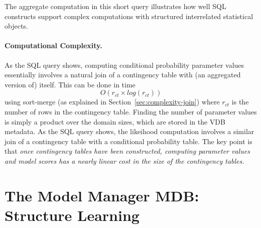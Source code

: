 The aggregate computation in this short query illustrates how well SQL constructs support complex computations with structured interrelated statistical objects. 

%

\paragraph{Computational Complexity.} As the SQL query shows, computing conditional probability parameter values essentially involves a natural join of a contingency table with (an aggregated version of) itself. This can be done in time $$O(r_{ct} \times log(r_{ct}))$$ using sort-merge (as explained in Section~\ref{sec:complexity-join}) where $r_{ct}$ is the number of rows in the contingency table. Finding the number of parameter values is simply a product over the domain sizes, which are stored in the VDB metadata. As the SQL query shows, the likeihood computation involves a similar join of a contingency table with a conditional probability table. The key point is that {\em once contingency tables have been constructed, computing parameter values and model scores has a nearly linear cost in the size of the contingency tables.} \label{sec:score-complexity}


\section{The Model Manager MDB: Structure Learning}
\label{sec:laj}

